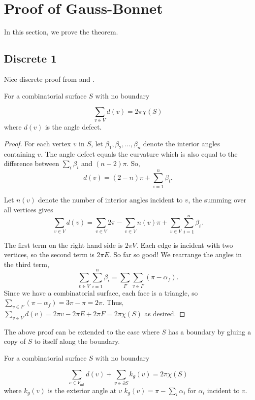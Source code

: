 \section{Proof of Gauss-Bonnet}
\label{sec:proof}


In this section, we prove the theorem.

\subsection{Discrete 1}
Nice discrete proof from \cite{upadhyay2015} and \cite{Crane:2013}.

\begin{theorem}\label{thm:g-b-discete-bdy}
For a combinatorial surface $S$ with no boundary

$$\sum_{v\in V} d(v)=2\pi \chi(S)$$
where $d(v)$ is the angle defect.
\end{theorem}

\begin{proof}
For each vertex $v$ in $S$,
let $\beta_1,\beta_2,\ldots,\beta_n$ denote the interior angles
containing $v$.
The angle defect equals the curvature which is also
equal to the difference between $\sum_i \beta_i $ and $(n-2)\pi$. 
So, $$d(v)=(2-n)\pi +\sum_{i=1}^n \beta_i.$$

Let $n(v)$ denote the number of interior angles incident to $v$, the summing over all vertices gives
$$\sum_{v\in V} d(v)=\sum_{v\in V}2\pi - \sum_{v\in V}n(v)\pi+\sum_{v\in V}\sum_{i=1}^n \beta_i.$$

The first term on the right hand side is $2\pi V$. Each edge is incident with two vertices, so the second
term is $2\pi E$. So far so good!
We rearrange the angles in the third term,
$$ \sum_{v\in V}\sum_{i=1}^n \beta_i=\sum_F\sum_{v\in F}(\pi-\alpha_f).$$
Since we have a combinatorial surface, each face is a triangle,
so $\sum_{v\in F}(\pi-\alpha_f)=3\pi-\pi=2\pi.$
Thus, $\sum_{v\in V} d(v)=2\pi v-2\pi E+2\pi F=2\pi \chi(S)$ as desired.
\end{proof}

The above proof can be extended to the case where $S$ has a boundary
by gluing a copy of $S$ to itself along the boundary.

\begin{theorem}\label{thm:g-b-discete}
For a combinatorial surface $S$ with no boundary

$$\sum_{v\in V_{\text{int}}} d(v)+\sum_{v\in\partial S}k_g(v)=2\pi \chi(S)$$
where $k_g(v)$ is the exterior angle at $v$ 
$k_g(v)=\pi-\sum_i\alpha_i$ for $\alpha_i$ incident to $v$.
\end{theorem}

